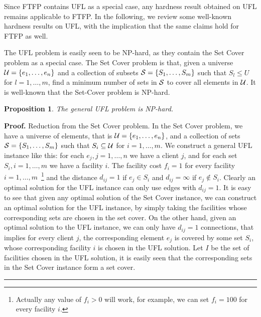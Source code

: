 \documentclass[oneside,final]{ucr}
\newtheorem{proposition}[theorem]{Proposition}
\newenvironment{proof}[1][Proof]{\textbf{#1.} }{\ \rule{0.5em}{0.5em}}
\begin{document}
Since FTFP contains UFL as a special case, any hardness result
obtained on UFL remains applicable to FTFP. In the following, we
review some well-known hardness results on UFL, with the implication
that the same claims hold for FTFP as well.

The UFL problem is easily seen to be NP-hard, as they contain the Set
Cover problem as a special case. The Set Cover problem is that, given
a universe $\calU = \{e_1, \ldots, e_n\}$ and a collection of subsets
$\calS = \{S_1, \ldots, S_m\}$ such that $S_l \leq U$ for
$l=1,\ldots,m$, find a minimum number of sets in $\calS$ to cover all
elements in $\calU$. It is well-known that the Set-Cover problem is
NP-hard.

\begin{proposition}\label{prop:UFLNP}
  The general UFL problem is NP-hard.
\end{proposition}
\begin{proof}
  Reduction from the Set Cover problem. In the Set Cover problem, we
  have a universe of elements, that is $\calU = \{e_1, \ldots, e_n\}$,
  and a collection of sets $\calS = \{S_1, \ldots, S_m\}$ such that
  $S_i \subseteq \calU$ for $i=1,\ldots,m$. We construct a general UFL
  instance like this: for each $e_j, j=1,\ldots,n$ we have a client
  $j$, and for each set $S_i, i=1,\ldots,m$ we have a facility
  $i$. The facility cost $f_i=1$ for every facility
  $i=1,\ldots,m$~\footnote{Actually any value of $f_i > 0$ will work,
    for example, we can set $f_i=100$ for every facility $i$.} and the
  distance $d_{ij} = 1$ if $e_j \in S_i$ and $d_{ij} = \infty$ if $e_j
  \notin S_i$. Clearly an optimal solution for the UFL instance can
  only use edges with $d_{ij} = 1$. It is easy to see that given any
  optimal solution of the Set Cover instance, we can construct an
  optimal solution for the UFL instance, by simply taking the
  facilities whose corresponding sets are chosen in the set cover. On
  the other hand, given an optimal solution to the UFL instance, we
  can only have $d_{ij}=1$ connections, that implies for every client
  $j$, the corresponding element $e_j$ is covered by some set $S_i$,
  whose corresponding facility $i$ is chosen in the UFL solution. Let
  $I$ be the set of facilities chosen in the UFL solution, it is
  easily seen that the corresponding sets in the Set Cover instance
  form a set cover.
\end{proof}
\end{document}
